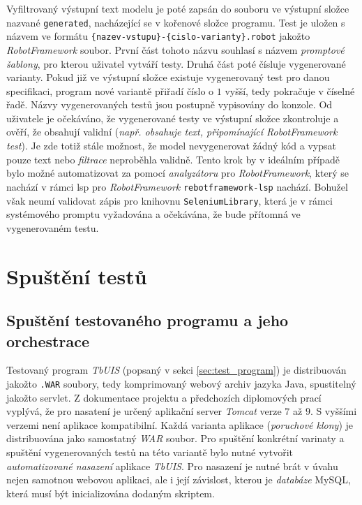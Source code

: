 \documentclass[czech, ma, kiv, he, iso690alph, pdf, viewonly]{fasthesis}
\begin{document}
        Vyfiltrovaný výstupní text modelu je poté zapsán do souboru ve výstupní složce nazvané \verb|generated|, nacházející se v kořenové složce programu. Test je uložen s názvem ve formátu \verb|{nazev-vstupu}-{cislo-varianty}.robot| jakožto \textit{RobotFramework} soubor. První část tohoto názvu souhlasí s názvem \textit{promptové šablony}, pro kterou uživatel vytváří testy. Druhá část poté čísluje vygenerované varianty. Pokud již ve výstupní složce existuje vygenerovaný test pro danou specifikaci, program nové variantě přiřadí číslo o \(1\) vyšší, tedy pokračuje v číselné řadě. Názvy vygenerovaných testů jsou postupně vypisovány do konzole. Od uživatele je očekáváno, že vygenerované testy ve výstupní složce zkontroluje a ověří, že obsahují validní (\textit{např. obsahuje text, připomínající RobotFramework test}). Je zde totiž stále možnost, že model nevygenerovat žádný kód a vypsat pouze text nebo \textit{filtrace} neproběhla validně. Tento krok by v ideálním případě bylo možné automatizovat za pomocí \textit{analyzátoru} pro \textit{RobotFramework}, který se nachází v rámci \Gls{lsp} pro \textit{RobotFramework} \verb|rebotframework-lsp| nachází. Bohužel však neumí validovat zápis pro knihovnu \verb|SeleniumLibrary|, která je v rámci systémového promptu vyžadována a očekávána, že bude přítomná ve vygenerovaném testu.


\chapter{Spuštění testů}

    \section{Spuštění testovaného programu a jeho orchestrace}

    Testovaný program \textit{TbUIS} (popsaný v sekci \ref{sec:test_program}) je distribuován jakožto \verb|.WAR| soubory, tedy komprimovaný webový archiv jazyka Java, spustitelný jakožto \gls{servlet}. Z dokumentace projektu a předchozích diplomových prací vyplývá, že pro nasatení je určený aplikační server \textit{Tomcat} verze \(7\) až \(9\). S vyššími verzemi není aplikace kompatibilní. Každá varianta aplikace (\textit{poruchové klony}) je distribuována jako samostatný \textit{WAR} soubor. Pro spuštění konkrétní varinaty a spuštění vygenerovaných testů na této variantě bylo nutné vytvořit \textit{automatizované nasazení} aplikace \textit{TbUIS}. Pro nasazení je nutné brát v úvahu nejen samotnou webovou aplikaci, ale i její závislost, kterou je \textit{databáze} MySQL, která musí být inicializována dodaným skriptem.
\end{document}
